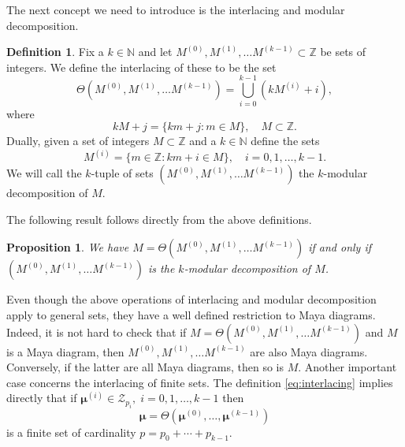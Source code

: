 \documentclass[10pt]{amsart}
\newtheorem{prop}[thm]{Proposition}
\theoremstyle{definition}
\newtheorem{definition}[thm]{Definition}
\numberwithin{equation}{section}
\numberwithin{figure}{section}
\newcommand{\N}{\mathbb{N}}
\newcommand{\Z}{\mathbb{Z}}
\newcommand{\bmu}{{\boldsymbol{\mu}}}
\newcommand{\cZ}{\mathcal{Z}}
\begin{document}
The next concept we need to introduce is the interlacing and modular
decomposition. 
\begin{definition}\label{def:interlacing}
  Fix a $k\in \N$ and let $M^{(0)}, M^{(1)},\ldots M^{(k-1)}\subset \Z$ be sets
  of integers.  We define the interlacing of these to be the set
  \begin{equation}\label{eq:interlacing} \Theta\left(M^{(0)}, M^{(1)},\ldots M^{(k-1)}\right)
    = \bigcup_{i=0}^{k-1} (k M^{(i)} +i),
 \end{equation}
 where
 \[ kM +j = \{ km + j \colon m\in M \},\quad M\subset \Z.\]
 Dually, given a set of integers $M\subset \Z$ and a $k\in \N$ define
 the sets
 \[ M^{(i)} = \{ m\in \Z \colon km+i \in M\},\quad i=0,1,\ldots, k-1.\]
 We will call the $k$-tuple of sets $\left(M^{(0)}, M^{(1)},\ldots M^{(k-1)}\right)$ the
 $k$-modular decomposition of $M$.
\end{definition}



The following result follows directly from the above definitions.
\begin{prop}
  We have $M=\Theta\left(M^{(0)}, M^{(1)},\ldots M^{(k-1)}\right)$ if and only if
  $\left(M^{(0)}, M^{(1)},\ldots M^{(k-1)}\right)$ is the $k$-modular decomposition of $M$.
\end{prop}

Even though the above operations of interlacing and modular
decomposition apply to general sets, they have a well defined
restriction to Maya diagrams.  Indeed, it is not hard to check that if
$M=\Theta\left(M^{(0)}, M^{(1)},\ldots M^{(k-1)}\right)$ and $M$ is a Maya diagram, then
 $M^{(0)}, M^{(1)},\ldots M^{(k-1)}$ are also Maya diagrams.  Conversely, if the latter are all Maya
diagrams, then so is $M$.  Another important case concerns the
interlacing of finite sets.  The definition \eqref{eq:interlacing}
implies directly that if $\bmu^{(i)} \in \cZ_{p_i},\; i=0,1,\ldots, k-1$
then
\[ \bmu = \Theta\left(\bmu^{(0)}, \ldots , \bmu^{(k-1)}\right) \]
is a finite set of cardinality $p=p_0+\cdots + p_{k-1}$.
\end{document}
